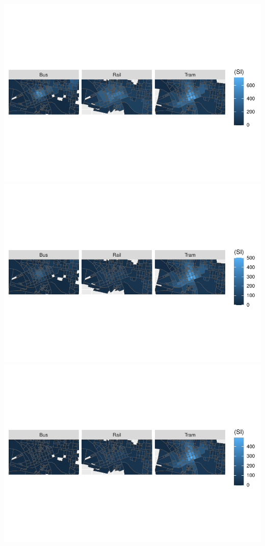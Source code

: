 \documentclass[preprint, 3p,
authoryear]{elsarticle} %
\begin{document}
\includegraphics{Leveraging_GTFS_to_assess_transit_supply_Transport_Geography_files/figure-latex/Melbourne_231015_by_mode-1.pdf}
\includegraphics{Leveraging_GTFS_to_assess_transit_supply_Transport_Geography_files/figure-latex/Melbourne_231015_by_mode-2.pdf}
\includegraphics{Leveraging_GTFS_to_assess_transit_supply_Transport_Geography_files/figure-latex/Melbourne_231015_by_mode-3.pdf}
\end{document}

